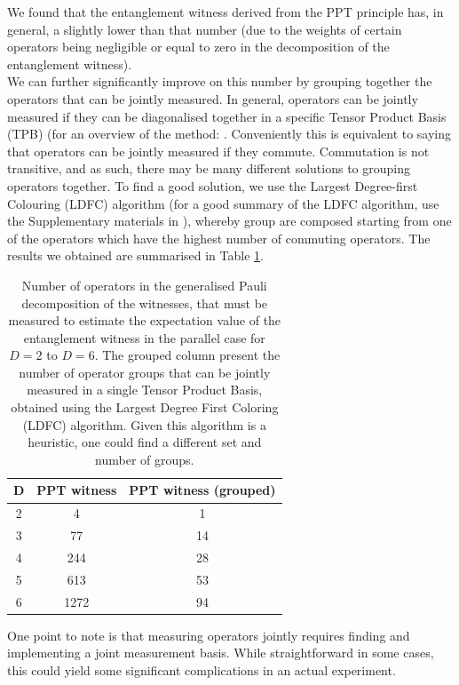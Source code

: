 \documentclass[%
 reprint,
 superscriptaddress,
 amsmath,
 amssymb,
 aps,
 longbibliography
]{revtex4-2}
\begin{document}
\indent We found that the entanglement witness derived from the PPT principle has, in general, a slightly lower than that number (due to the weights of certain operators being negligible or equal to zero in the decomposition of the entanglement witness). \\
\indent We can further significantly improve on this number by grouping together the operators that can be jointly measured. In general, operators can be jointly measured if they can be diagonalised together in a specific Tensor Product Basis (TPB) (for an overview of the method: \cite{Gokhale2019}. Conveniently this is equivalent to saying that operators can be jointly measured if they commute. Commutation is not transitive, and as such, there may be many different solutions to grouping operators together. To find a good solution, we use the Largest Degree-first Colouring (LDFC) algorithm (for a good summary of the LDFC algorithm, use the Supplementary materials in \cite{Hamamura2020}), whereby group are composed starting from one of the operators which have the highest number of commuting operators. The results we obtained are summarised in Table \ref{tab:table1}. \\

\begin{table}
\begin{ruledtabular}
\begin{tabular}{ ccc }
  D & PPT witness & PPT witness (grouped) \\
  \hline
  2 & 4 & 1   \\
  3 & 77 & 14  \\
  4 & 244 & 28 \\  
  5 & 613 & 53 \\
  6 & 1272 & 94\\  
\end{tabular}
\end{ruledtabular}
\caption{\label{tab:table1} Number of operators in the generalised Pauli decomposition of the witnesses, that must be measured to estimate the expectation value of the entanglement witness in the parallel case for $D=2$ to $D=6$. The grouped column present the number of operator groups that can be jointly measured in a single Tensor Product Basis, obtained using the Largest Degree First Coloring (LDFC) algorithm. Given this algorithm is a heuristic, one could find a different set and number of groups.}
\end{table}
\indent One point to note is that measuring operators jointly requires finding and implementing a joint measurement basis. While straightforward in some cases, this could yield some significant complications in an actual experiment.\\
\end{document}
